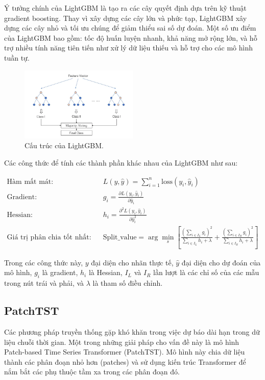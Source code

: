 \documentclass{ieeeojies}
\begin{document}
Ý tưởng chính của LightGBM là tạo ra các cây quyết định dựa trên kỹ thuật gradient boosting. Thay vì xây dựng các cây lớn và phức tạp, LightGBM xây dựng các cây nhỏ và tối ưu chúng để giảm thiểu sai số dự đoán. Một số ưu điểm của LightGBM bao gồm: tốc độ huấn luyện nhanh, khả năng mở rộng lớn, và hỗ trợ nhiều tính năng tiên tiến như xử lý dữ liệu thiếu và hỗ trợ cho các mô hình tuần tự.

\begin{figure}[h]
    \centering
    \includegraphics[width=0.5\textwidth]{bibliography/lightgbm.png}
    \caption{Cấu trúc của LightGBM.}
\end{figure}

Các công thức để tính các thành phần khác nhau của LightGBM như sau: 

\begin{align*}
\text{Hàm mất mát:} \quad & L(y, \hat{y}) = \sum_{i=1}^{n} \text{loss}(y_i, \hat{y}_i) \\
\text{Gradient:} \quad & g_i = \frac{\partial L(y_i, \hat{y}_i)}{\partial \hat{y}_i} \\
\text{Hessian:} \quad & h_i = \frac{\partial^2 L(y_i, \hat{y}_i)}{\partial \hat{y}_i^2} \\
\text{Giá trị phân chia tốt nhất:} 
\quad & \text{Split\_value} = \arg\min_{s} \left[ \frac{(\sum_{i \in I_L} g_i)^2}{\sum_{i \in I_L} h_i + \lambda} + \frac{(\sum_{i \in I_R} g_i)^2}{\sum_{i \in I_R} h_i + \lambda} \right]
\end{align*}

Trong các công thức này, $y$ đại diện cho nhãn thực tế, $\hat{y}$ đại diện cho dự đoán của mô hình, $g_i$ là gradient, $h_i$ là Hessian, $I_L$ và $I_R$ lần lượt là các chỉ số của các mẫu trong nút trái và phải, và $\lambda$ là tham số điều chỉnh.

\subsection{PatchTST}
Các phương pháp truyền thống gặp khó khăn trong việc dự báo dài hạn trong dữ liệu chuỗi thời gian. Một trong những giải pháp cho vấn đề này là mô hình Patch-based Time Series Transformer (PatchTST). Mô hình này chia dữ liệu thành các phân đoạn nhỏ hơn (patches) và sử dụng kiến trúc Transformer để nắm bắt các phụ thuộc tầm xa trong các phân đoạn đó.
\end{document}
